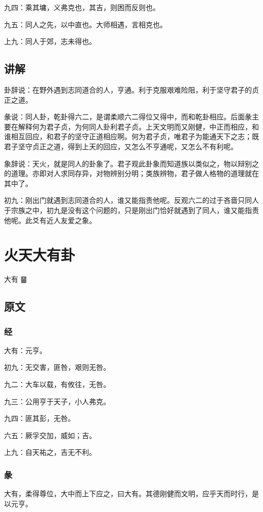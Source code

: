 \documentclass[12pt,oneside]{book}
\begin{document}
九四：乘其墉，义弗克也，其吉，则困而反则也。

九五：同人之先，以中直也。大师相遇，言相克也。

上九：同人于郊，志未得也。

\section{讲解}
卦辞说：在野外遇到志同道合的人，亨通。利于克服艰难险阻，利于坚守君子的贞正之道。

彖说：同人卦，乾卦得六二，是谓柔顺六二得位又得中，而和乾卦相应。后面彖主要在解释何为君子贞，为何同人卦利君子贞。上天文明而又刚健，中正而相应，和谁相互回应，和君子的坚守正道相应啊。何为君子贞，唯君子为能通天下之志；既君子坚守贞正之道，得到上天的回应，又怎么不亨通呢，又怎么不有利呢。

象辞说：天火，就是同人的卦象了。君子观此卦象而知道族以类似之，物以辩别之的道理。亦即对人求同存异，对物辨别分明；类族辨物，君子做人格物的道理就在其中了。

初九：刚出门就遇到志同道合的人，谁又能指责他呢。反观六二的过于吝啬只同人于宗族之中，初九是没有这个问题的，只是刚出门恰好就遇到了同人，谁又能指责他呢。此爻有近人友爱之象。



\chapter{火天大有卦}
大有 {\Large ䷍}

\section{原文}

\subsection{经}
大有：元亨。

初九：无交害，匪咎，艰则无咎。

九二：大车以载，有攸往，无咎。

九三：公用亨于天子，小人弗克。

九四：匪其彭，无咎。

六五：厥孚交加，威如；吉。

上九：自天祐之，吉无不利。

\subsection{彖}
大有，柔得尊位，大中而上下应之，曰大有。其德刚健而文明，应乎天而时行，是以元亨。
\end{document}
